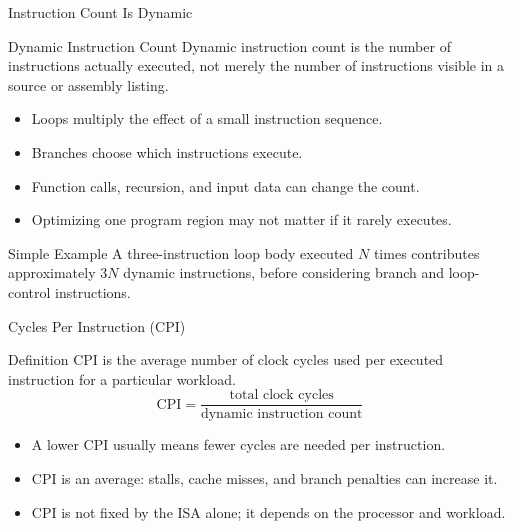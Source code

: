 \documentclass[aspectratio=169,11pt,t]{beamer}
\begin{document}
\begin{frame}{Instruction Count Is Dynamic}
\begin{block}{Dynamic Instruction Count}
Dynamic instruction count is the number of instructions actually executed, not merely the number of instructions visible in a source or assembly listing.
\end{block}
\vspace{0.2cm}
\begin{itemize}
\item Loops multiply the effect of a small instruction sequence.
\item Branches choose which instructions execute.
\item Function calls, recursion, and input data can change the count.
\item Optimizing one program region may not matter if it rarely executes.
\end{itemize}
\vspace{0.15cm}
\begin{block}{Simple Example}
A three-instruction loop body executed $N$ times contributes approximately $3N$ dynamic instructions, before considering branch and loop-control instructions.
\end{block}
\end{frame}

\begin{frame}{Cycles Per Instruction (CPI)}
\begin{block}{Definition}
CPI is the average number of clock cycles used per executed instruction for a particular workload.
\[
\text{CPI}=\frac{\text{total clock cycles}}{\text{dynamic instruction count}}
\]
\end{block}
\vspace{0.15cm}
\begin{itemize}
\item A lower CPI usually means fewer cycles are needed per instruction.
\item CPI is an average: stalls, cache misses, and branch penalties can increase it.
\item CPI is not fixed by the ISA alone; it depends on the processor and workload.
\end{itemize}
\end{frame}
\end{document}
